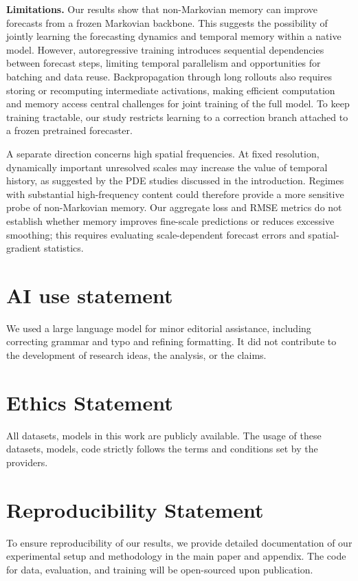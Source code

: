 \documentclass[11pt]{article}
\begin{document}
{\textbf{Limitations.} Our results show that non-Markovian memory can improve forecasts from a frozen Markovian backbone. This suggests the possibility of jointly learning the forecasting dynamics and temporal memory within a native model. However, autoregressive training introduces sequential dependencies between forecast steps, limiting temporal parallelism and opportunities for batching and data reuse. Backpropagation through long rollouts also requires storing or recomputing intermediate activations, making efficient computation and memory access central challenges for joint training of the full model. To keep training tractable, our study restricts learning to a correction branch attached to a frozen pretrained forecaster.

A separate direction concerns high spatial frequencies. At fixed resolution, dynamically important unresolved scales may increase the value of temporal history, as suggested by the PDE studies discussed in the introduction. Regimes with substantial high-frequency content could therefore provide a more sensitive probe of non-Markovian memory. Our aggregate loss and RMSE metrics do not establish whether memory improves fine-scale predictions or reduces excessive smoothing; this requires evaluating scale-dependent forecast errors and spatial-gradient statistics.}
\FloatBarrier


\clearpage
\section*{AI use statement}

We used a large language model for minor editorial assistance, including correcting grammar and
typo and refining formatting. It did not contribute to the development of research ideas, the analysis,
or the claims.

\section*{Ethics Statement}
All datasets, models in this work are publicly available. The usage of these datasets, models, code strictly follows the terms and conditions set by the providers. 

\section*{Reproducibility Statement}
To ensure reproducibility of our results, we provide detailed documentation of our experimental setup and methodology in the main paper and appendix. The code for data, evaluation,
and training will be open-sourced upon publication.
\end{document}
